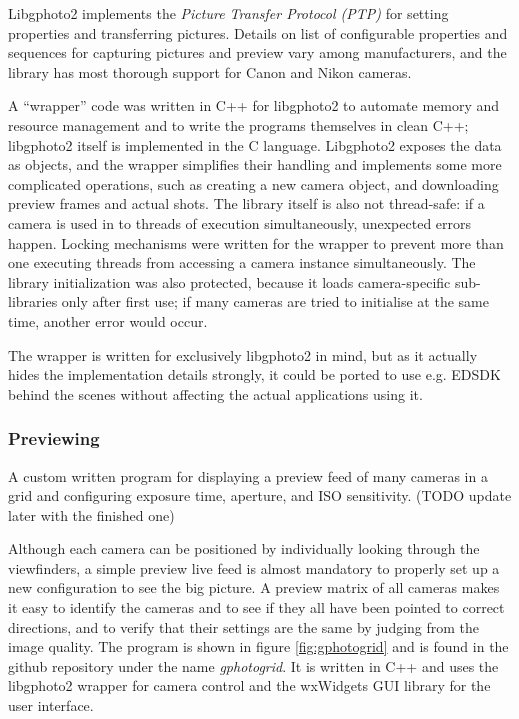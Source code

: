 Libgphoto2 implements the \emph{Picture Transfer Protocol (PTP)} \cite{ptpTODO} for setting properties and transferring pictures.
Details on list of configurable properties and sequences for capturing pictures and preview vary among manufacturers, and the library has most thorough support for Canon and Nikon cameras.

A ``wrapper'' code was written in C++ for libgphoto2 to automate memory and resource management and to write the programs themselves in clean C++; libgphoto2 itself is implemented in the C language.
Libgphoto2 exposes the data as objects, and the wrapper simplifies their handling and implements some more complicated operations, such as creating a new camera object, and downloading preview frames and actual shots.
The library itself is also not thread-safe: if a camera is used in to threads of execution simultaneously, unexpected errors happen.
Locking mechanisms were written for the wrapper to prevent more than one executing threads from accessing a camera instance simultaneously.
The library initialization was also protected, because it loads camera-specific sub-libraries only after first use; if many cameras are tried to initialise at the same time, another error would occur.

The wrapper is written for exclusively libgphoto2 in mind, but as it actually hides the implementation details strongly, it could be ported to use e.g. EDSDK behind the scenes without affecting the actual applications using it.


\subsubsection{Previewing} %

{A custom written program for displaying a preview feed of many cameras in a grid and configuring exposure time, aperture, and ISO sensitivity. (TODO update later with the finished one)}


Although each camera can be positioned by individually looking through the viewfinders, a simple preview live feed is almost mandatory to properly set up a new configuration to see the big picture.
A preview matrix of all cameras makes it easy to identify the cameras and to see if they all have been pointed to correct directions, and to verify that their settings are the same by judging from the image quality.
The program is shown in figure \ref{fig:gphotogrid} and is found in the github repository under the name \emph{gphotogrid}.
It is written in C++ and uses the libgphoto2 wrapper for camera control and the wxWidgets GUI library for the user interface.

